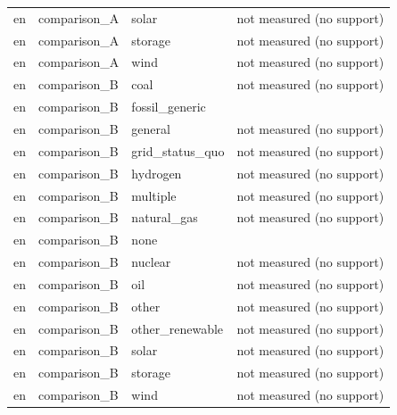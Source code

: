 \begin{longtable}{>{\raggedright\arraybackslash}p{91.6pt}>{\raggedright\arraybackslash}p{92.2pt}>{\raggedright\arraybackslash}p{95.1pt}>{\raggedright\arraybackslash}p{128.1pt}}
en & comparison\_\allowbreak{}A & solar & not measured (no support) \\
en & comparison\_\allowbreak{}A & storage & not measured (no support) \\
en & comparison\_\allowbreak{}A & wind & not measured (no support) \\
en & comparison\_\allowbreak{}B & coal & not measured (no support) \\
en & comparison\_\allowbreak{}B & fossil\_\allowbreak{}generic & 0.000 \\
en & comparison\_\allowbreak{}B & general & not measured (no support) \\
en & comparison\_\allowbreak{}B & grid\_\allowbreak{}status\_\allowbreak{}quo & not measured (no support) \\
en & comparison\_\allowbreak{}B & hydrogen & not measured (no support) \\
en & comparison\_\allowbreak{}B & multiple & not measured (no support) \\
en & comparison\_\allowbreak{}B & natural\_\allowbreak{}gas & not measured (no support) \\
en & comparison\_\allowbreak{}B & none & 0.000 \\
en & comparison\_\allowbreak{}B & nuclear & not measured (no support) \\
en & comparison\_\allowbreak{}B & oil & not measured (no support) \\
en & comparison\_\allowbreak{}B & other & not measured (no support) \\
en & comparison\_\allowbreak{}B & other\_\allowbreak{}renewable & not measured (no support) \\
en & comparison\_\allowbreak{}B & solar & not measured (no support) \\
en & comparison\_\allowbreak{}B & storage & not measured (no support) \\
en & comparison\_\allowbreak{}B & wind & not measured (no support) \\
\end{longtable}
\endgroup
